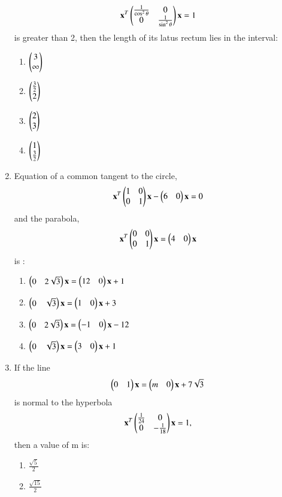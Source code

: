 \documentclass[journal,12pt,twocolumn]{IEEEtran}
\begin{document}
\begin{enumerate}[label=\arabic*]
    \begin{align}
    \mathbf{x}^T\begin{pmatrix}\frac{1}{\cos^2\theta}&0\\0&\frac{1}{\sin^2\theta}\end{pmatrix} \mathbf{x}=1 
    \end{align} is greater than 2, then the length of its latus rectum lies in the interval:
    \begin{enumerate}
    \item $\begin{pmatrix}3\\\infty\end{pmatrix}$
    \item $\begin{pmatrix}\frac{3}{2}\\2\end{pmatrix}$
    \item $\begin{pmatrix}2\\3\end{pmatrix}$
    \item $\begin{pmatrix}1\\\frac{3}{2}\end{pmatrix}$
    \end{enumerate}
    \item Equation of a common tangent to the circle,
    \begin{align}
    \mathbf{x}^T\begin{pmatrix}1&0\\0&1\end{pmatrix}\mathbf{x}-\begin{pmatrix}6&0\end{pmatrix}\mathbf{x}=0
    \end{align} and the parabola,
    \begin{align}
    \mathbf{x}^T\begin{pmatrix}0&0\\0&1\end{pmatrix}\mathbf{x}=\begin{pmatrix}4&0\end{pmatrix}\mathbf{x}
    \end{align} is :
    \begin{enumerate}
    \item $\begin{pmatrix}0&2\sqrt{3}\end{pmatrix}\mathbf{x}=\begin{pmatrix}12&0\end{pmatrix}\mathbf{x}+1$
    \item $\begin{pmatrix}0&\sqrt{3}\end{pmatrix}\mathbf{x}=\begin{pmatrix}1&0\end{pmatrix}\mathbf{x}+3$
    \item $\begin{pmatrix}0&2\sqrt{3}\end{pmatrix}\mathbf{x}=\begin{pmatrix}-1&0\end{pmatrix}\mathbf{x}-12$
    \item $\begin{pmatrix}0&\sqrt{3}\end{pmatrix}\mathbf{x}=\begin{pmatrix}3&0\end{pmatrix}\mathbf{x}+1$
    \end{enumerate}
    \item If the line 
    \begin{align}
    \begin{pmatrix}0&1\end{pmatrix}\mathbf{x}=\begin{pmatrix}m&0\end{pmatrix}\mathbf{x}+7\sqrt{3}
    \end{align} is normal to the hyperbola 
    \begin{align}
    \mathbf{x}^T\begin{pmatrix}\frac{1}{24}&0\\0&-\frac{1}{18}\end{pmatrix}\mathbf{x}=1,
    \end{align} then a value of m is:
    \begin{enumerate}
    \item $\frac{\sqrt{5}}{2}$
    \item $\frac{\sqrt{15}}{2}$

\end{enumerate}
\end{enumerate}
\end{document}
